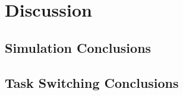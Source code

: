 \documentclass[10pt,letterpaper]{article}
\begin{document}





\section*{Discussion}
\subsection*{Simulation Conclusions}

\subsection*{Task Switching Conclusions}
\end{document}
